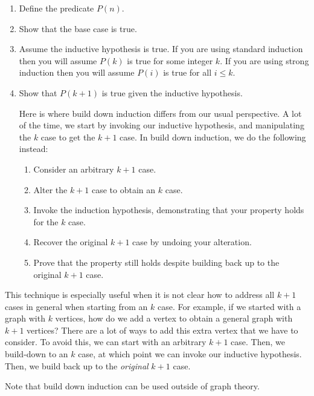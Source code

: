 \documentclass[12pt,letterpaper]{article}
\begin{document}
\begin{enumerate}
        \item Define the predicate $P(n)$.

        \item Show that the base case is true.

        \item Assume the inductive hypothesis is true. If you are using standard induction then you will assume 
            $P(k)$ is true for some integer $k$. If you are using strong induction then you will assume $P(i)$ is true for all $i \leq k$.

        \item Show that $P(k+1)$ is true given the inductive hypothesis.
        
            Here is where build down induction differs from our usual perspective. A lot of the time, we start by invoking our inductive hypothesis, and manipulating the $k$ case to get the $k+1$ case. In build down induction, we do the following instead:

            \begin{enumerate}
            \item Consider an arbitrary $k+1$ case.
            \item Alter the $k+1$ case to obtain an $k$ case.
            \item Invoke the induction hypothesis, demonstrating that your property holds for the $k$ case.
            \item Recover the original $k+1$ case by undoing your alteration.
            \item Prove that the property still holds despite building back up to the original $k+1$ case.
            \end{enumerate}
            \end{enumerate}

        This technique is especially useful when it is not clear how to address all $k+1$ cases in general when starting from an $k$ case. For example, if we started with a graph with $k$ vertices, how do we add a vertex to obtain a general graph with $k+1$ vertices? There are a lot of ways to add this extra vertex that we have to consider. To avoid this, we can start with an arbitrary $k+1$ case. Then, we build-down to an $k$ case, at which point we can invoke our inductive hypothesis. Then, we build back up to the \emph{original} $k+1$ case.

Note that build down induction can be used outside of graph theory.
\end{document}
